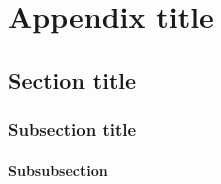 \graphicspath{{./7_Appendix/}}
\chapter{Appendix title}\label{app:stability}

\section{Section title}\label{app:sec:sectiontitle}

\subsection{Subsection title}\label{app:subsec:subsectiontitle}

\subsubsection{Subsubsection}\label{app:subsubsec:subsubsectiontitle}
\blindtext